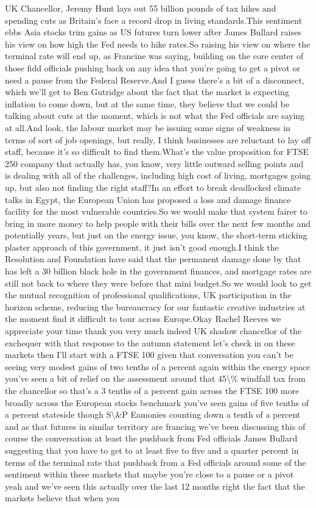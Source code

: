 \documentclass{article}%
\begin{document}
UK Chancellor, Jeremy Hunt lays out 55 billion pounds of tax hikes and spending cuts as Britain's face a record drop in living standards.This sentiment ebbs Asia stocks trim gains as US futures turn lower after James Bullard raises his view on how high the Fed needs to hike rates.So raising his view on where the terminal rate will end up, as Francine was saying, building on the core center of those fidd officials pushing back on any idea that you're going to get a pivot or need a pause from the Federal Reserve.And I guess there's a bit of a disconnect, which we'll get to Ben Gutridge about the fact that the market is expecting inflation to come down, but at the same time, they believe that we could be talking about cuts at the moment, which is not what the Fed officials are saying at all.And look, the labour market may be issuing some signs of weakness in terms of sort of job openings, but really, I think businesses are reluctant to lay off staff, because it's so difficult to find them.What's the value proposition for FTSE 250 company that actually has, you know, very little outward selling points and is dealing with all of the challenges, including high cost of living, mortgages going up, but also not finding the right staff?In an effort to break deadlocked climate talks in Egypt, the European Union has proposed a loss and damage finance facility for the most vulnerable countries.So we would make that system fairer to bring in more money to help people with their bills over the next few months and potentially years, but just on the energy issue, you know, the short{-}term sticking plaster approach of this government, it just isn't good enough.I think the Resolution and Foundation have said that the permanent damage done by that has left a 30 billion black hole in the government finances, and mortgage rates are still not back to where they were before that mini budget.So we would look to get the mutual recognition of professional qualifications, UK participation in the horizon scheme, reducing the bureaucracy for our fantastic creative industries at the moment find it difficult to tour across Europe.Okay Rachel Reeves we appreciate your time thank you very much indeed UK shadow chancellor of the exchequer with that response to the autumn statement let's check in on these markets then I'll start with a FTSE 100 given that conversation you can't be seeing very modest gains of two tenths of a percent again within the energy space you've seen a bit of relief on the assessment around that 45\textbackslash{}\% windfall tax from the chancellor so that's a 3 tenths of a percent gain across the FTSE 100 more broadly across the European stocks benchmark you've seen gains of five tenths of a percent stateside though S\textbackslash{}\&P Eamonies counting down a tenth of a percent and as that futures in similar territory are francing we've been discussing this of course the conversation at least the pushback from Fed officials James Bullard suggesting that you have to get to at least five to five and a quarter percent in terms of the terminal rate that pushback from a Fed officials around some of the sentiment within these markets that maybe you're close to a pause or a pivot yeah and we've seen this actually over the last 12 months right the fact that the markets believe that when you 
\end{document}
